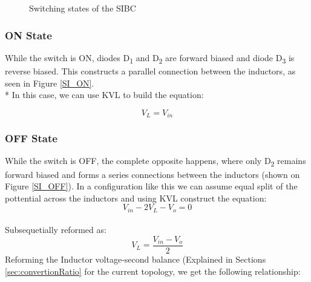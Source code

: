\begin{figure}[H]%
    \centering
    \qquad
    \caption{Switching states of the SIBC}%
     \label{fig:SI_States}%
\end{figure}

\subsubsection{ON State}
While the switch is ON, diodes D\textsubscript{1} and D\textsubscript{2} are forward biased and diode D\textsubscript{3} is reverse biased.
This constructs a parallel connection between the inductors, as seen in Figure \ref{SI_ON}.
\\*
In this case, we can use KVL to build the equation: 

\begin{equation}
	V_L=V_{in}
	\label{eq:SI_KVL_ON}
\end{equation}

\subsubsection{OFF State}
While the switch is OFF, the complete opposite happens, where only D\textsubscript{2} remains forward biased and forms a series connections between the inductors (shown on Figure \ref{SI_OFF}).
In a configuration like this we can assume equal split of the pottential across the inductors and using KVL construct the equation:
\begin{equation}
	V_{in}-2V_L-V_o=0
	\label{eq:SI_KVL_OFF}
\end{equation}\\
Subsequetially reformed as:
\begin{equation}
	V_L=\frac{V_{in} - V_o}{2}
	\label{eq:SI_KVL_OFF2}
\end{equation}
Reforming the Inductor voltage-second balance (Explained in Sections \ref{sec:convertionRatio} for the current topology, we get the following relationship:

